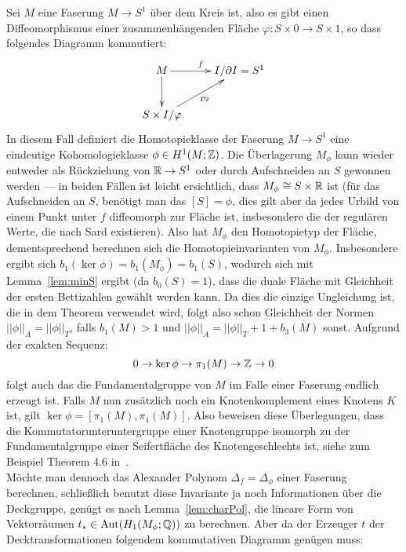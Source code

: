     
    \begin{bsp}
    	Sei $M$ eine Faserung $M\to S^1$ über dem Kreis ist, also es gibt einen Diffeomorphismus einer zusammenhängenden Fläche $\varphi: S \times 0 \to S\times 1$, so dass folgendes Diagramm kommutiert:
    	\[
    		\begin{xy}
    			\xymatrix{M \ar[r]^f \ar[d] &I/\partial I = S^1 \\
    					S\times I /\varphi \ar[ru]_{p_2}}
    		\end{xy}
    	\]
    	In diesem Fall definiert die Homotopieklasse der Faserung $M \to S^1$ eine eindeutige Kohomologieklasse $\phi\in H^1(M;\mathbb{Z})$. Die Überlagerung $M_\phi$ kann wieder entweder als Rückziehung von $\mathbb{R} \to S^1$ oder durch Aufschneiden an $S$ gewonnen werden --- in beiden Fällen ist leicht ersichtlich, dass $M_\phi \cong S \times \mathbb{R}$ ist (für das Aufschneiden an $S$, benötigt man das $[S]=\phi$, dies gilt aber da jedes Urbild von einem Punkt unter $f$ diffeomorph zur Fläche ist, insbesondere die der regulären Werte, die nach Sard existieren). Also hat $M_\phi$ den Homotopietyp der Fläche, dementsprechend berechnen sich die Homotopieinvarianten von $M_\phi$.  Insbesondere ergibt sich $b_1(\ker\phi) =b_1(M_\phi)= b_1(S)$, wodurch sich mit Lemma~\ref{lem:minS} ergibt (da $b_0(S)=1$), dass die duale Fläche mit Gleichheit der ersten Bettizahlen gewählt werden kann. Da dies die einzige Ungleichung ist, die in dem Theorem verwendet wird, folgt also schon Gleichheit der Normen $||\phi||_A = ||\phi||_T$, falls $b_1(M)>1$ und $||\phi||_A = ||\phi||_T+1+b_3(M)$ sonst. Aufgrund der exakten Sequenz:
    	\[
    		0 \to \ker\phi \to \pi_1(M) \to \mathbb{Z} \to 0
    	\]
    	folgt auch das die Fundamentalgruppe von $M$ im Falle einer Faserung endlich erzeugt ist. Falls $M$ nun zusätzlich noch ein Knotenkomplement eines Knotens $K$ ist, gilt $\ker\phi = [\pi_1(M),\pi_1(M)]$. Also beweisen diese Überlegungen, dass die Kommutatorunteruntergruppe einer Knotengruppe isomorph zu der Fundamentalgruppe einer Seifertfläche des Knotengeschlechts ist, siehe zum Beispiel Theorem 4.6 in~\cite{Burde2003}.\\
    	Möchte man dennoch das Alexander Polynom $\Delta_f=\Delta_\phi$ einer Faserung berechnen, schließlich benutzt diese Invariante ja noch Informationen über die Deckgruppe, genügt es nach Lemma~\ref{lem:charPol}, die lineare Form von Vektorräumen $t_* \in \operatorname{Aut}(H_1(M_\phi;\mathbb{Q}))$ zu berechnen. Aber da der Erzeuger $t$ der Decktransformationen folgendem kommutativen Diagramm genügen muss:

\end{bsp}
